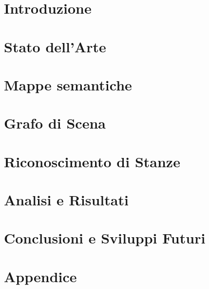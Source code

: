 \documentclass[a4paper, oneside]{book}
\author{Luca Brini}
\begin{document}


\tableofcontents


\chapter*{Introduzione}



\chapter{Stato dell'Arte}


\chapter{Mappe semantiche}



\chapter{Grafo di Scena}\label{chap:grafo_di_scena}



\chapter{Riconoscimento di Stanze}\label{chap:riconoscimento_stanze}



\chapter{Analisi e Risultati}



\chapter{Conclusioni e Sviluppi Futuri}



\appendix
\chapter{Appendice}



\printbibliography
\end{document}

